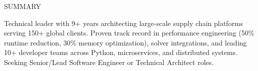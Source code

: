 \documentclass{resume} %
\begin{document}

\begin{rSection}{SUMMARY}

    {
       Technical leader with 9+ years architecting large-scale supply chain platforms serving 150+ global clients. Proven track record in performance engineering (50\% runtime reduction, 30\% memory optimization), solver integrations, and leading 10+ developer teams across Python, microservices, and distributed systems. Seeking Senior/Lead Software Engineer or Technical Architect roles.
    }

\end{rSection}

\end{document}
